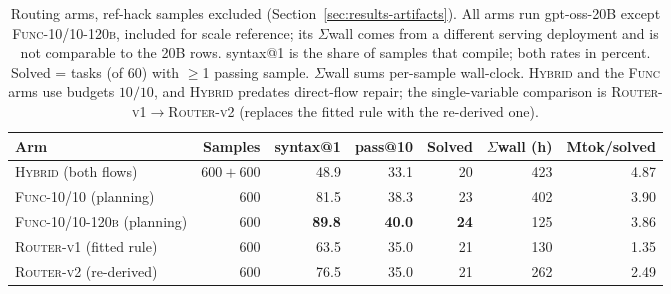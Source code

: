 \begin{table}[htbp]
  \centering
  \caption[Routing ablation arms]{Routing arms, ref-hack
    samples excluded (Section~\ref{sec:results-artifacts}). All arms
    run gpt-oss-20B except \textsc{Func-10/10-120b}, included for
    scale reference; its $\Sigma$wall comes from a different serving
    deployment and is not comparable to the 20B rows. syntax@1 is
    the share of samples that compile; both rates in percent. Solved =
    tasks (of 60) with $\geq$1 passing sample. $\Sigma$wall sums per-sample
    wall-clock. \textsc{Hybrid} and the \textsc{Func} arms use budgets
    $10/10$, and \textsc{Hybrid} predates direct-flow repair; the
    single-variable comparison is
    \textsc{Router-v1}$\to$\textsc{Router-v2} (replaces the fitted
    rule with the re-derived one).}
  \label{tab:routing}
  \footnotesize
  \setlength{\tabcolsep}{4pt}
  \begin{tabular}{lrrrrrr}
    \toprule
    Arm & Samples & syntax@1 & pass@10 & Solved & $\Sigma$wall (h) & Mtok/solved \\
    \midrule
    \textsc{Hybrid} (both flows)      & $600{+}600$ & 48.9 & 33.1 & 20 & 423 & 4.87 \\
    \textsc{Func-10/10} (planning)    & 600 & 81.5 & 38.3 & 23 & 402 & 3.90 \\
    \textsc{Func-10/10-120b} (planning) & 600 & \textbf{89.8} & \textbf{40.0} & \textbf{24} & 125 & 3.86 \\
    \textsc{Router-v1} (fitted rule)  & 600 & 63.5 & 35.0 & 21 & 130 & 1.35 \\
    \textsc{Router-v2} (re-derived)   & 600 & 76.5 & 35.0 & 21 & 262 & 2.49 \\
    \bottomrule
  \end{tabular}
\end{table}

